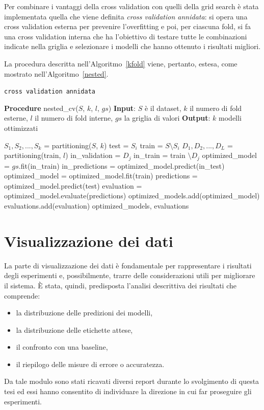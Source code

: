 \documentclass[12pt]{report}
\theoremstyle{definition}
\begin{document}
Per combinare i vantaggi della cross validation con quelli della grid search è stata implementata quella che viene definita \textit{cross validation annidata}: si opera una cross validation esterna per prevenire l'overfitting e poi, per ciascuna fold, si fa una cross validation interna che ha l'obiettivo di testare tutte le combinazioni indicate nella griglia e selezionare i modelli che hanno ottenuto i risultati migliori.

La procedura descritta nell'Algoritmo~\ref{kfold} viene, pertanto, estesa, come mostrato nell'Algoritmo~\ref{nested}.
\begin{algorithm}
\caption{\texttt{cross validation annidata}}
\label{nested}
\hspace*{\algorithmicindent} \textbf{Procedure} nested\_cv($S$, $k$, $l$, $gs$)
\newline
\hspace*{\algorithmicindent} \textbf{Input}: $S$ è il dataset, $k$ il numero di fold esterne, $l$ il numero di fold interne, $gs$ la griglia di valori
\newline
\hspace*{\algorithmicindent} \textbf{Output}: $k$ modelli ottimizzati
\begin{algorithmic}[1]
\STATE $S_1, S_2, ..., S_k$ = partitioning($S$, $k$)
\STATE test = $S_i$
\STATE train = $S \setminus S_i$
\STATE $D_1, D_2, ..., D_L$ = partitioning(train, $l$)
\STATE in\_validation = $D_j$
\STATE in\_train = train $\setminus D_j$
\STATE optimized\_model = $gs$.fit(in\_train)
\STATE in\_predictions = optimized\_model.predict(in\_test)
\ENDFOR
\STATE optimized\_model = optimized\_model.fit(train)
\STATE predictions = optimized\_model.predict(test)
\STATE evaluation = optimized\_model.evaluate(predictions) 
\STATE optimized\_models.add(optimized\_model)
\STATE evaluations.add(evaluation)
\ENDFOR
\RETURN optimized\_models, evaluations
\end{algorithmic}
\end{algorithm}

\section{Visualizzazione dei dati}\label{datavisualizationimpl}
La parte di visualizzazione dei dati è fondamentale per rappresentare i risultati degli esperimenti e, possibilmente, trarre delle considerazioni utili per migliorare il sistema. \`E stata, quindi, predisposta l'analisi descrittiva dei risultati che comprende:
\begin{itemize}
    \item la distribuzione delle predizioni dei modelli,
    \item la distribuzione delle etichette attese,
    \item il confronto con una baseline,
    \item il riepilogo delle misure di errore o accuratezza.
\end{itemize}
Da tale modulo sono stati ricavati diversi report durante lo svolgimento di questa tesi ed essi hanno consentito di individuare la direzione in cui far proseguire gli esperimenti.
\end{document}
